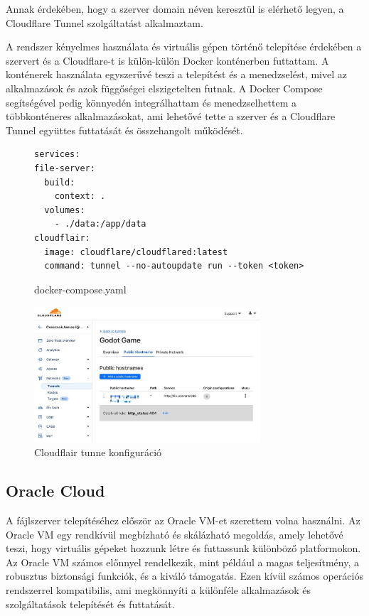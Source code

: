 Annak érdekében, hogy a szerver domain néven keresztül is elérhető legyen, a Cloudflare Tunnel szolgáltatást alkalmaztam. 

A rendszer kényelmes használata és virtuális gépen történő telepítése érdekében a szervert és a Cloudflare-t is külön-külön Docker konténerben futtattam.
A konténerek használata egyszerűvé teszi a telepítést és a menedzselést, mivel az alkalmazások és azok függőségei elszigetelten futnak. 
A Docker Compose segítségével pedig könnyedén integrálhattam és menedzselhettem a többkonténeres alkalmazásokat, ami lehetővé tette a szerver és a Cloudflare Tunnel együttes futtatását és összehangolt működését.

\begin{figure}[h]
    \centering
\begin{lstlisting}
services:
file-server:
  build:
    context: .
  volumes:
    - ./data:/app/data
cloudflair:
  image: cloudflare/cloudflared:latest 
  command: tunnel --no-autoupdate run --token <token>
\end{lstlisting}
\caption*{docker-compose.yaml}
\label{code:docker-compose}
\end{figure}
\begin{figure}[h]
    \centering
    \includegraphics[width=0.75\textwidth]{img/cloudflair-censored.jpg}
    \caption{Cloudflair tunne konfiguráció}
    \label{img:cloudflair-config}  
\end{figure}


\subsection{Oracle Cloud}
A fájlszerver telepítéséhez először az Oracle VM-et szerettem volna használni. Az Oracle VM egy rendkívül megbízható és skálázható megoldás, amely lehetővé teszi, hogy virtuális gépeket hozzunk létre és futtassunk különböző platformokon. Az Oracle VM számos előnnyel rendelkezik, mint például a magas teljesítmény, a robusztus biztonsági funkciók, és a kiváló támogatás. Ezen kívül számos operációs rendszerrel kompatibilis, ami megkönnyíti a különféle alkalmazások és szolgáltatások telepítését és futtatását.

